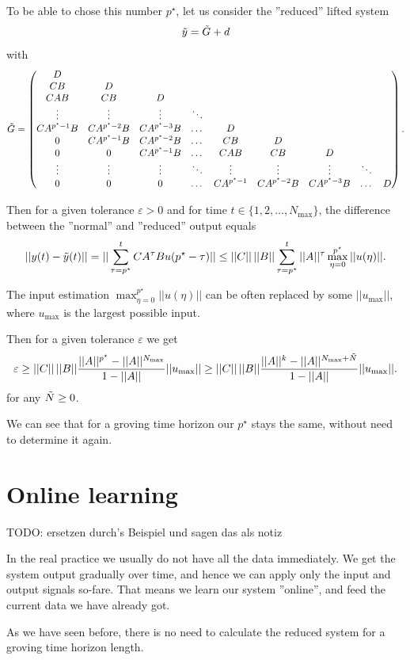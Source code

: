 	To be able to chose this number $p^\star$, let us consider the ''reduced'' lifted system  
	\begin{align}
	\tilde{y} = \tilde{G} + d 
	\end{align}
	with 
	\begin{align}
	\tilde{G} = \begin{pmatrix}
	D  \\
	CB & D \\
	C A B & CB & D\\
	\vdots & \vdots & \vdots & \ddots \\
	C A^{p^\star-1} B & C A^{p^\star-2}B & C A^{p^\star-3}B &\dots& D \\
	0           & C A^{p^\star-1} B & C A^{p^\star-2} B & \dots & CB & D\\
	0 & 0 & C A^{p^\star-1} B & \dots & CAB & CB & D \\
	\vdots & \vdots & \vdots & \ddots & \vdots & \vdots & \vdots & \ddots \\
	0 & 0 & 0 & \dots & C A^{p^\star-1}& C A^{p^\star-2}B& CA^{p^\star-3}B &\dots & D
	\end{pmatrix}.
	\end{align}
	
	Then for a given tolerance $\varepsilon>0$ and for time $t \in \{1,2, \dots , N_{\max}\}$, the difference between the ''normal'' and ''reduced'' output equals
	\begin{align}
	||y(t) - \tilde{y}(t)|| = ||\sum_{\tau = p^\star}^{t} C A^{\tau} B u(p^\star - \tau)|| \leq ||C|| \, ||B|| \sum_{\tau = p^\star}^t ||A||^\tau \max_{\eta = 0}^{p^\star}||u(\eta)||. 
	\end{align}
	
	The input estimation $\max_{\eta = 0}^{p^\star}||u(\eta)||$ can be often replaced by some $||u_{\max}||$, where $u_{\max}$ is the largest possible input. 
	
	Then for a given tolerance $\varepsilon$ we get 	
	\begin{align}
	\varepsilon \geq ||C||\, ||B|| \frac{||A||^{p^\star} - ||A||^{N_{\max}}}{1 - ||A||} ||u_{\max}|| \geq ||C|| \, ||B|| \frac{||A||^k - ||A||^{N_{\max} + \tilde{N}}}{1 - ||A||}||u_{\max}||.
	\end{align}
	for any $\tilde{N} \geq 0$. 
	
	We can see that for a groving time horizon our $p^\star$ stays the same, without need to determine it again. 
	
	\section{Online learning} 
	TODO: ersetzen durch's Beispiel und sagen das als notiz
	
	In the real practice we usually do not have all the data immediately. We get the system output gradually over time, and hence we can apply only the input and output signals so-fare. That means we learn our system ''online'', and feed the current data we have already got. 
	
 	As we have seen before, there is no need to calculate the reduced system for a groving time horizon length. 
	
	
	
	
	
	